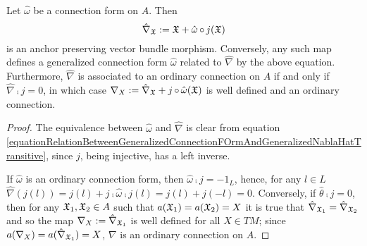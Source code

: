 \begin{proposition}
Let $\hat \omega$ be a connection form on $A$. Then 
\begin{equation}\label{equationRelationBetweenGeneralizedConnectionFOrmAndGeneralizedNablaHatTransitive}
    \hat \nabla_{\mathfrak{X}} := \mathfrak{X} + \hat \omega \operatorname{\circ} j(\mathfrak{X})
\end{equation}
is an anchor preserving vector bundle morphism. Conversely, any such map defines a generalized connection form $\hat \omega$ related to $\hat \nabla$ by the above equation. Furthermore, $\hat \nabla$ is associated to an ordinary connection on $A$ if and only if $\hat \nabla \comp j = 0$, in which case $\nabla_X := \hat \nabla_{\mathfrak{X}} + j \operatorname{\circ} \hat \omega(\mathfrak{X})$ is well defined and an ordinary connection.
\end{proposition}

\begin{proof}
The equivalence between $\hat \omega$ and $\hat \nabla$ is clear from equation \eqref{equationRelationBetweenGeneralizedConnectionFOrmAndGeneralizedNablaHatTransitive}, since $j$, being injective, has a left inverse.

If $\hat \omega$ is an ordinary connection form, then $\hat \omega \comp j = -1_L$, hence, for any $l \in L$ $\hat \nabla(j(l)) = j(l) + j \comp \hat \omega \comp j(l) = j(l) + j(-l) = 0$. Conversely, if $\hat \theta \comp j= 0$, then for any $\mathfrak{X}_1, \mathfrak{X}_2 \in A$ such that $a(\mathfrak{X}_1) = a(\mathfrak{X}_2) = X$ it is true that $\hat \nabla_{\mathfrak{X}_1} = \hat \nabla_{\mathfrak{X}_2}$ and so the map $\nabla_X := \hat \nabla_{\mathfrak{X}_1}$ is well defined for all $X \in TM$; since $a(\nabla_X) = a(\hat \nabla_{\mathfrak{X}_1}) = X$, $\nabla$ is an ordinary connection on $A$.
\end{proof}

